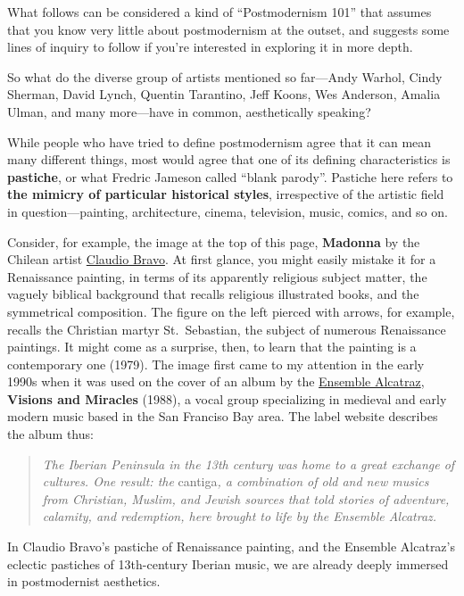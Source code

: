 \documentclass[
  letterpaper,
  DIV=11,
  numbers=noendperiod,
  oneside]{scrartcl}
\begin{document}
What follows can be considered a kind of ``Postmodernism 101'' that
assumes that you know very little about postmodernism at the outset, and
suggests some lines of inquiry to follow if you're interested in
exploring it in more depth.

So what do the diverse group of artists mentioned so far---Andy Warhol,
Cindy Sherman, David Lynch, Quentin Tarantino, Jeff Koons, Wes Anderson,
Amalia Ulman, and many more---have in common, aesthetically speaking?

While people who have tried to define postmodernism agree that it can
mean many different things, most would agree that one of its defining
characteristics is \textbf{pastiche}, or what Fredric Jameson called
``blank parody''. Pastiche here refers to \textbf{the mimicry of
particular historical styles}, irrespective of the artistic field in
question---painting, architecture, cinema, television, music, comics,
and so on.

Consider, for example, the image at the top of this page,
\textbf{Madonna} by the Chilean artist
\href{https://en.wikipedia.org/wiki/Claudio_Bravo_(painter)}{Claudio
Bravo}. At first glance, you might easily mistake it for a Renaissance
painting, in terms of its apparently religious subject matter, the
vaguely biblical background that recalls religious illustrated books,
and the symmetrical composition. The figure on the left pierced with
arrows, for example, recalls the Christian martyr St.~Sebastian, the
subject of numerous Renaissance paintings. It might come as a surprise,
then, to learn that the painting is a contemporary one (1979). The image
first came to my attention in the early 1990s when it was used on the
cover of an album by the
\href{https://www.kitka.org/ensemble-alcatraz}{Ensemble Alcatraz},
\textbf{Visions and Miracles} (1988), a vocal group specializing in
medieval and early modern music based in the San Franciso Bay area. The
label website describes the album thus:

\begin{quote}
\emph{The Iberian Peninsula in the 13th century was home to a great
exchange of cultures. One result: the }cantiga\emph{, a combination of
old and new musics from Christian, Muslim, and Jewish sources that told
stories of adventure, calamity, and redemption, here brought to life by
the Ensemble Alcatraz.}
\end{quote}

In Claudio Bravo's pastiche of Renaissance painting, and the Ensemble
Alcatraz's eclectic pastiches of 13th-century Iberian music, we are
already deeply immersed in postmodernist aesthetics.
{}
\end{document}
